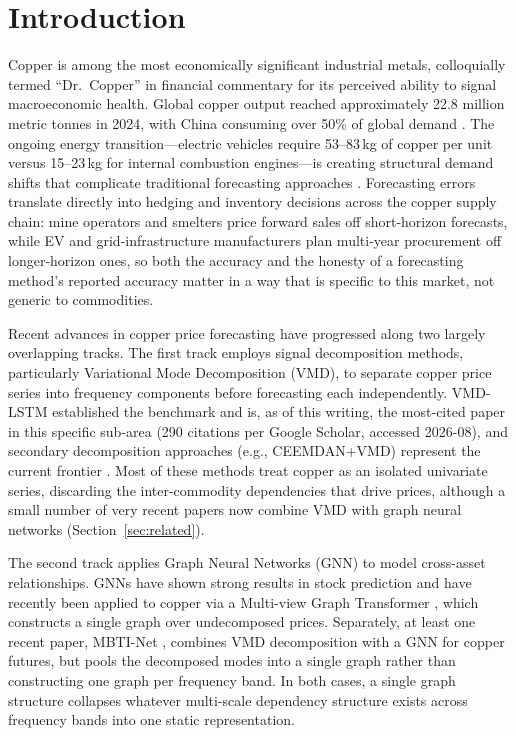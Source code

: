 \documentclass[journal]{IEEEtran}
\begin{document}
\maketitle
\IEEEdisplaynontitleabstractindextext
\IEEEpeerreviewmaketitle

\section{Introduction}
\label{sec:intro}

Copper is among the most economically significant industrial metals, colloquially termed ``Dr.\ Copper'' in financial commentary for its perceived ability to signal macroeconomic health. Global copper output reached approximately 22.8 million metric tonnes in 2024, with China consuming over 50\% of global demand \citep{IEA2024}. The ongoing energy transition---electric vehicles require 53--83\,kg of copper per unit versus 15--23\,kg for internal combustion engines---is creating structural demand shifts that complicate traditional forecasting approaches \citep{IEA2024}. Forecasting errors translate directly into hedging and inventory decisions across the copper supply chain: mine operators and smelters price forward sales off short-horizon forecasts, while EV and grid-infrastructure manufacturers plan multi-year procurement off longer-horizon ones, so both the accuracy and the honesty of a forecasting method's reported accuracy matter in a way that is specific to this market, not generic to commodities.

Recent advances in copper price forecasting have progressed along two largely overlapping tracks. The first track employs signal decomposition methods, particularly Variational Mode Decomposition (VMD), to separate copper price series into frequency components before forecasting each independently. VMD-LSTM \citep{Liu2020} established the benchmark and is, as of this writing, the most-cited paper in this specific sub-area (290 citations per Google Scholar, accessed 2026-08), and secondary decomposition approaches (e.g., CEEMDAN+VMD) represent the current frontier \citep{Zhang2025a, ZhangKe2025}. Most of these methods treat copper as an isolated univariate series, discarding the inter-commodity dependencies that drive prices, although a small number of very recent papers now combine VMD with graph neural networks (Section~\ref{sec:related}).

The second track applies Graph Neural Networks (GNN) to model cross-asset relationships. GNNs have shown strong results in stock prediction \citep{Cheng2022, Qian2024} and have recently been applied to copper via a Multi-view Graph Transformer \citep{Sun2025}, which constructs a single graph over undecomposed prices. Separately, at least one recent paper, MBTI-Net \citep{LiLiu2026}, combines VMD decomposition with a GNN for copper futures, but pools the decomposed modes into a single graph rather than constructing one graph per frequency band. In both cases, a single graph structure collapses whatever multi-scale dependency structure exists across frequency bands into one static representation.
\end{document}
